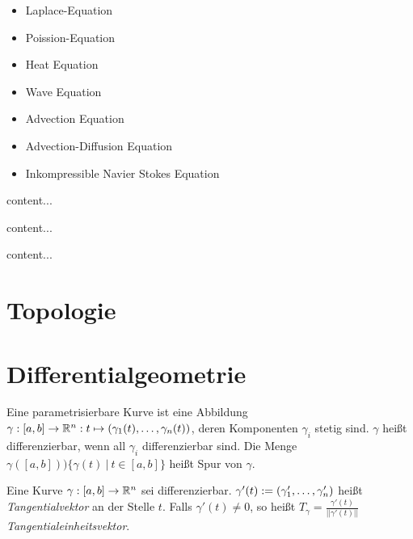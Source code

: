\begin{definition}
	\begin{itemize}
		\item Laplace-Equation
		\item Poission-Equation
		\item Heat Equation
		\item Wave Equation
		\item Advection Equation
		\item Advection-Diffusion Equation
		\item Inkompressible Navier Stokes Equation 
	\end{itemize}
\end{definition}

\begin{satz}
	content...
\end{satz}

\begin{satz}
	content...
\end{satz}

\begin{satz}
	content...
\end{satz}


\pagebreak


\section{Topologie}

\pagebreak


\section{Differentialgeometrie}


\begin{definition}
	Eine parametrisierbare Kurve ist eine Abbildung $\gamma : [a, b] \rightarrow \mathbb{R}^n : t \mapsto (\gamma_1(t), \dots, \gamma_n(t))$, deren Komponenten $\gamma_i$ stetig sind. $\gamma$ heißt differenzierbar, wenn all $\gamma_i$ differenzierbar sind. Die Menge $\gamma([a,b]) ) \{\gamma(t) \medspace | \medspace t \in [a,b] \}$ heißt Spur von $\gamma$.
\end{definition}

\begin{definition}[Tangentialvektor]
	Eine Kurve $\gamma : [a,b] \rightarrow \mathbb{R}^n$ sei differenzierbar. $\gamma'(t) := (\gamma'_1, \dots, \gamma'_n)$ heißt \emph{Tangentialvektor} an der Stelle $t$. Falls $\gamma'(t) \neq 0$, so heißt $T_\gamma = \frac{\gamma'(t)}{||\gamma'(t)||}$ \emph{Tangentialeinheitsvektor}.
\end{definition}

